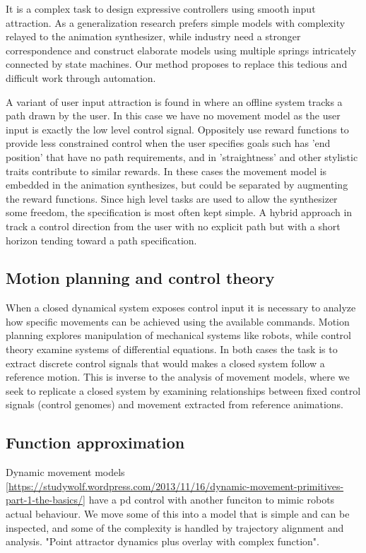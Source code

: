 It is a complex task to design expressive controllers using smooth input attraction. As a generalization research prefers simple models with complexity relayed to the animation synthesizer, while industry need a stronger correspondence and construct elaborate models using multiple springs intricately connected by state machines. Our method proposes to replace this tedious and difficult work through automation. 

A variant of user input attraction is found in \citep{treuille07} where an offline system tracks a path drawn by the user. In this case we have no movement model as the user input is exactly the low level control signal. Oppositely \citep{kovar02} use reward functions to provide less constrained control when the user specifies goals such has 'end position' that have no path requirements, and in \citep{lee18} 'straightness' and other stylistic traits contribute to similar rewards. In these cases the movement model is embedded in the animation synthesizes, but could be separated by augmenting the reward functions. Since high level tasks are used to allow the synthesizer some freedom, the specification is most often kept simple. A hybrid approach in \citep{lee10} track a control direction from the user with no explicit path but with a short horizon tending toward a path specification.

\subsection{Motion planning and control theory}
When a closed dynamical system exposes control input it is necessary to analyze how specific movements can be achieved using the available commands. Motion planning explores manipulation of mechanical systems like robots, while control theory examine systems of differential equations. In both cases the task is to extract discrete control signals that would makes a closed system follow a reference motion. This is inverse to the analysis of movement models, where we seek to replicate a closed system by examining relationships between fixed control signals (control genomes) and movement extracted from reference animations. 

\subsection{Function approximation}

Dynamic movement models \ref{https://studywolf.wordpress.com/2013/11/16/dynamic-movement-primitives-part-1-the-basics/} have a pd control with another funciton to mimic robots actual behaviour. We move some of this into a model that is simple and can be inspected, and some of the complexity is handled by trajectory alignment and analysis. "Point attractor dynamics plus overlay with complex function".

